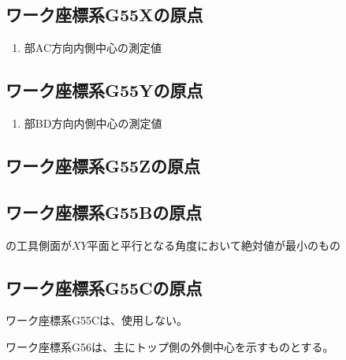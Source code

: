 \subsection{ワーク座標系{\ttfamily G55X}の原点}
\begin{enumerate}[label*=\sarrow]
\item \BottomEndFace 部AC方向内側中心の測定値
\end{enumerate}


\subsection{ワーク座標系{\ttfamily G55Y}の原点}
\begin{enumerate}[label*=\sarrow]
\item \BottomEndFace 部BD方向内側中心の測定値
\end{enumerate}


\subsection{ワーク座標系{\ttfamily G55Z}の原点\TBW}


\subsection{ワーク座標系{\ttfamily G55B}の原点}
\Jig の工具側面が$XY$平面と平行となる角度において絶対値が最小のもの


\subsection{ワーク座標系{\ttfamily G55C}の原点}
ワーク座標系{\ttfamily G55C}は、使用しない。



ワーク座標系{\ttfamily G56}は、主にトップ側の外側中心を示すものとする。


